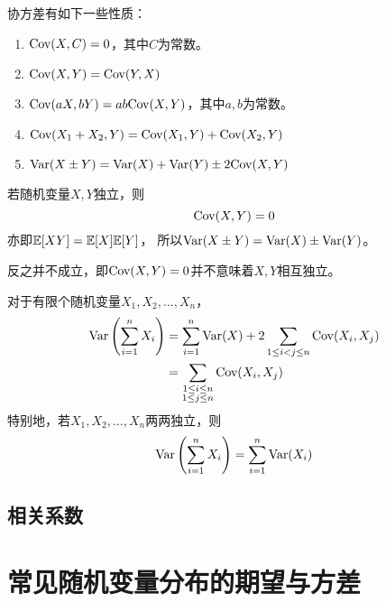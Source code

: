 \begin{theorem}[协方差的性质]
  协方差有如下一些性质：
  \begin{enumerate}
    \item 
    $\textrm{Cov}(X,C) = 0$，其中$C$为常数。
    \item
    $\textrm{Cov}(X,Y) = \textrm{Cov}(Y,X)$
    \item 
    $\textrm{Cov}(aX,bY)=ab\textrm{Cov}(X,Y)$，其中$a,b$为常数。
    \item 
    $\textrm{Cov}(X_1+X_2,Y)=\textrm{Cov}(X_1,Y)+\textrm{Cov}(X_2,Y)$
    \item 
    $\textrm{Var}(X\pm Y)=\textrm{Var}(X)+\textrm{Var}(Y)\pm 2\textrm{Cov}(X,Y)$
  \end{enumerate}
\end{theorem}

\begin{theorem}[相互独立的随机变量的协方差]
  若随机变量$X,Y$独立，则
  \begin{displaymath}
    \textrm{Cov}(X,Y) = 0
  \end{displaymath}
  亦即$\mathbb{E}[XY]=\mathbb{E}[X]\mathbb{E}[Y]$，
  所以$\textrm{Var}(X\pm Y) = \textrm{Var}(X)\pm \textrm{Var}(Y)$。
\end{theorem}

\begin{remark}
  反之并不成立，即$\textrm{Cov}(X,Y)=0$并不意味着$X,Y$相互独立。
\end{remark}

\begin{theorem}[随机变量和的方差]
  对于有限个随机变量$X_1,X_2,\dots,X_n$，
  \begin{align*}
    \textrm{Var}\left(\sum_{i=1}^{n}X_i\right)
    &= \sum_{i=1}^{n}\textrm{Var}(X) + 2\sum_{1\le i<j\le n}\textrm{Cov}(X_i,X_j) \\
    &= \sum_{\substack{1\le i\le n \\ 1\le j\le n}}\textrm{Cov}(X_i,X_j)
  \end{align*}
  特别地，若$X_1,X_2,\dots,X_n$两两独立，则
  \begin{displaymath}
    \textrm{Var}\left(\sum_{i=1}^{n}X_i\right) = \sum_{i=1}^{n}\textrm{Var}(X_i)
  \end{displaymath}
\end{theorem}

\subsection{相关系数}

\section{常见随机变量分布的期望与方差}

